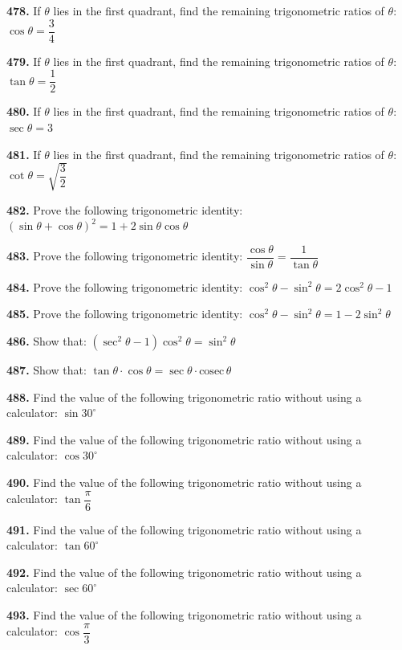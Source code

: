 \documentclass[11pt]{article}
\begin{document}
\bigskip
\noindent\textbf{478.} If $\theta$ lies in the first quadrant, find the remaining trigonometric ratios of $\theta$: $\cos\theta=\dfrac{3}{4}$

\bigskip
\noindent\textbf{479.} If $\theta$ lies in the first quadrant, find the remaining trigonometric ratios of $\theta$: $\tan\theta=\dfrac{1}{2}$

\bigskip
\noindent\textbf{480.} If $\theta$ lies in the first quadrant, find the remaining trigonometric ratios of $\theta$: $\sec\theta=3$

\bigskip
\noindent\textbf{481.} If $\theta$ lies in the first quadrant, find the remaining trigonometric ratios of $\theta$: $\cot\theta=\sqrt{\dfrac{3}{2}}$

\bigskip
\noindent\textbf{482.} Prove the following trigonometric identity: $(\sin\theta+\cos\theta)^2=1+2\sin\theta\cos\theta$

\bigskip
\noindent\textbf{483.} Prove the following trigonometric identity: $\dfrac{\cos\theta}{\sin\theta}=\dfrac{1}{\tan\theta}$

\bigskip
\noindent\textbf{484.} Prove the following trigonometric identity: $\cos^2\theta-\sin^2\theta=2\cos^2\theta-1$

\bigskip
\noindent\textbf{485.} Prove the following trigonometric identity: $\cos^2\theta-\sin^2\theta=1-2\sin^2\theta$

\bigskip
\noindent\textbf{486.} Show that: $(\sec^2\theta-1)\cos^2\theta=\sin^2\theta$

\bigskip
\noindent\textbf{487.} Show that: $\tan\theta\cdot\cos\theta=\sec\theta\cdot\text{cosec}\,\theta$

\bigskip
\noindent\textbf{488.} Find the value of the following trigonometric ratio without using a calculator: $\sin30^{\circ}$

\bigskip
\noindent\textbf{489.} Find the value of the following trigonometric ratio without using a calculator: $\cos30^{\circ}$

\bigskip
\noindent\textbf{490.} Find the value of the following trigonometric ratio without using a calculator: $\tan\dfrac{\pi}{6}$

\bigskip
\noindent\textbf{491.} Find the value of the following trigonometric ratio without using a calculator: $\tan60^{\circ}$

\bigskip
\noindent\textbf{492.} Find the value of the following trigonometric ratio without using a calculator: $\sec60^{\circ}$

\bigskip
\noindent\textbf{493.} Find the value of the following trigonometric ratio without using a calculator: $\cos\dfrac{\pi}{3}$
\end{document}
